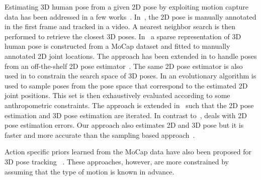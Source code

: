 \documentclass[10pt,twocolumn,letterpaper]{article}
\begin{document}
Estimating 3D human pose from a given 2D pose by exploiting motion capture data has been addressed in a few works~\cite{SimoSerraCVPR2012,Ramakrishna_2012,yasin-2013,SimoSerraCVPR2013,Wang_2014_CVPR}. In~\cite{yasin-2013}, the 2D pose is manually annotated in the first frame and tracked in a video. A nearest neighbor search is then performed to retrieve the closest 3D poses.
In~\cite{Ramakrishna_2012} a sparse representation of 3D human pose is constructed from a MoCap dataset and fitted to manually annotated 2D joint locations. The approach has been extended in \cite{Wang_2014_CVPR} to handle poses from an off-the-shelf 2D pose estimator~\cite{YiYang-2011}. The same 2D pose estimator is also used in \cite{SimoSerraCVPR2012,SimoSerraCVPR2013} to constrain the search space of 3D poses. In \cite{SimoSerraCVPR2012} an evolutionary algorithm is used to sample poses from the pose space that correspond to the estimated 2D joint positions. This set is then exhaustively evaluated according to some anthropometric constraints. The approach is extended in~\cite{SimoSerraCVPR2013} such that the 2D pose estimation and 3D pose estimation are iterated. In contrast to~\cite{Ramakrishna_2012,Wang_2014_CVPR,SimoSerraCVPR2012}, \cite{SimoSerraCVPR2013} deals with 2D pose estimation errors. Our approach also estimates 2D and 3D pose but it is faster and more accurate than the sampling based approach~\cite{SimoSerraCVPR2013}.

Action specific priors learned from the MoCap data have also been proposed for 3D pose tracking ~\cite{UrtasunFF06,420}. These approaches, however, are more constrained by assuming that the type of motion is known in advance. 

\vspace{-2.1mm}
\end{document}
